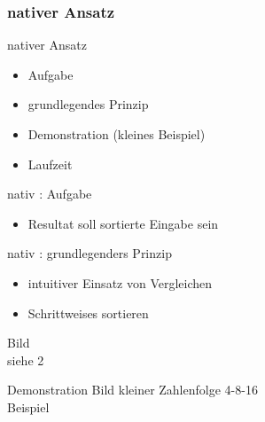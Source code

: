 \documentclass[ucs,9pt]{beamer}
\begin{document}
\subsubsection*{nativer Ansatz}
\begin{frame}{nativer Ansatz}
\begin{itemize}
\item Aufgabe
\item grundlegendes Prinzip
\item Demonstration (kleines Beispiel)
\item Laufzeit
\end{itemize}
\end{frame}
\begin{frame}{nativ : Aufgabe}
\begin{itemize}
\item Resultat soll sortierte Eingabe sein
\end{itemize}
\end{frame}
\begin{frame}{nativ : grundlegenders Prinzip}
\begin{itemize}
\item intuitiver Einsatz von Vergleichen
\item Schrittweises sortieren
\end{itemize}
Bild \\
siehe 2 
\end{frame}
\begin{frame}{Demonstration}
Bild kleiner Zahlenfolge 4-8-16\\
Beispiel
\end{frame}
\end{document}
